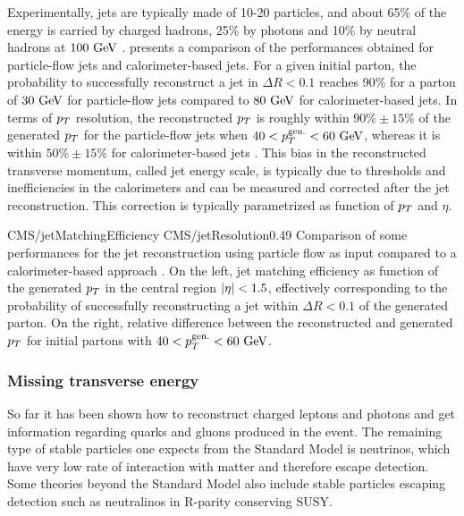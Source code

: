     Experimentally, jets are typically made of 10-20 particles, and about 65\% of the
    energy is carried by charged hadrons, 25\% by photons and 10\% by neutral hadrons
    at $100~\text{GeV}$ \cite{JetPerf}.
     presents a comparison of the performances obtained
    for particle-flow jets and calorimeter-based jets. For a given initial parton, the
    probability to successfully reconstruct a jet in $\Delta R < 0.1$ reaches 90\% for
    a parton of $30~\text{GeV}$ for particle-flow jets compared to $80~\text{GeV}$ for
    calorimeter-based jets. In terms of $p_T$ resolution, the reconstructed $p_T$ is
    roughly within $90\% \pm 15\%$ of the generated $p_T$ for the particle-flow jets
    when $40 < p_T^\text{gen.} < 60~\text{GeV}$, whereas it is within $50\% \pm 15\%$ for
    calorimeter-based jets \cite{particleFlow}. This bias in the reconstructed transverse momentum, called
    jet energy scale, is typically due to thresholds and inefficiencies in the calorimeters
    and can be measured and corrected after the jet reconstruction. This correction is
    typically parametrized as function of $p_T$ and $\eta$.

    {CMS/jetMatchingEfficiency}
    {CMS/jetResolution}{0.49}
    {Comparison of some performances for the jet reconstruction using particle flow as
    input compared to a calorimeter-based approach \cite{particleFlow}. On the left, jet matching efficiency
    as function of the generated $p_T$ in the central region $\left| \eta \right| < 1.5$, effectively
    corresponding to the probability of successfully reconstructing a jet within
    $\Delta R < 0.1$ of the generated parton. On the right, relative difference between
    the reconstructed and generated $p_T$ for initial partons with $40 < p_T^\text{gen.} < 60~\text{GeV}$.
    }

        \subsubsection{Missing transverse energy}

    So far it has been shown how to reconstruct charged leptons and photons and get
    information regarding quarks and gluons produced in the event. The remaining
    type of stable particles one expects from the Standard Model is neutrinos, which
    have very low rate of interaction with matter and therefore escape detection. Some
    theories beyond the Standard Model also include stable particles escaping detection
    such as neutralinos in R-parity conserving SUSY.

